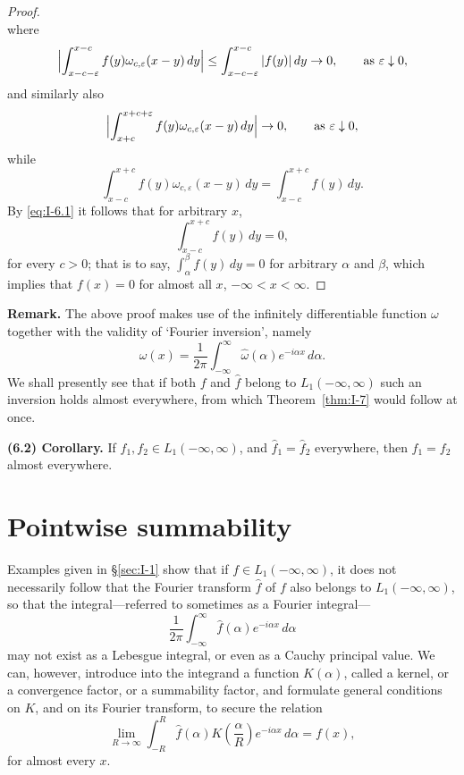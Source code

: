 \begin{proof}
\begin{equation*}
\end{equation*}
where
\begin{equation*}
\Bigl|\int_{x-c-\varepsilon}^{x-c}f(y)\omega_{c,\varepsilon}(x-y)\,dy\Bigr|
\le\int_{x-c-\varepsilon}^{x-c}|f(y)|\,dy\to 0,
\qquad\text{as }\varepsilon\downarrow 0,
\end{equation*}
and similarly also
\begin{equation*}
\Bigl|\int_{x+c}^{x+c+\varepsilon}f(y)\omega_{c,\varepsilon}(x-y)\,dy\Bigr|\to 0,
\qquad\text{as }\varepsilon\downarrow 0,
\end{equation*}
while
\begin{equation*}
\int_{x-c}^{x+c}f(y)\omega_{c,\varepsilon}(x-y)\,dy
=\int_{x-c}^{x+c}f(y)\,dy.
\end{equation*}
By \eqref{eq:I-6.1} it follows that for arbitrary $x$,
\begin{equation*}
\int_{x-c}^{x+c}f(y)\,dy=0,
\end{equation*}
for every $c>0$; that is to say, $\int_\alpha^\beta f(y)\,dy=0$ for arbitrary $\alpha$ and $\beta$, which implies that $f(x)=0$ for almost all $x$, $-\infty<x<\infty$.
\end{proof}

\noindent\textbf{Remark.}
The above proof makes use of the infinitely differentiable function $\omega$ together with the validity of `Fourier inversion', namely
\begin{equation*}
\omega(x)=\frac{1}{2\pi}\int_{-\infty}^{\infty}\hat\omega(\alpha)e^{-i\alpha x}\,d\alpha.
\end{equation*}
We shall presently see that if both $f$ and $\hat f$ belong to $L_1(-\infty,\infty)$ such an inversion holds almost everywhere, from which Theorem~\ref{thm:I-7} would follow at once.

\noindent\textbf{(6.2) Corollary.}
If $f_1,f_2\in L_1(-\infty,\infty)$, and $\hat f_1=\hat f_2$ everywhere, then $f_1=f_2$ almost everywhere.

\section{Pointwise summability}
\label{sec:I-7}

Examples given in \S\ref{sec:I-1} show that if $f\in L_1(-\infty,\infty)$, it does not necessarily follow that the Fourier transform $\hat f$ of $f$ also belongs to $L_1(-\infty,\infty)$, so that the integral---referred to sometimes as a Fourier integral---
\begin{equation*}
\frac{1}{2\pi}\int_{-\infty}^{\infty}\hat f(\alpha)e^{-i\alpha x}\,d\alpha
\end{equation*}
may not exist as a Lebesgue integral, or even as a Cauchy principal value. We can, however, introduce into the integrand a function $K(\alpha)$, called a kernel, or a convergence factor, or a summability factor, and formulate general conditions on $K$, and on its Fourier transform, to secure the relation
\begin{equation*}
\lim_{R\to\infty}\int_{-R}^{R}\hat f(\alpha)K\!\left(\frac{\alpha}{R}\right)e^{-i\alpha x}\,d\alpha=f(x),
\end{equation*}
for almost every $x$.

